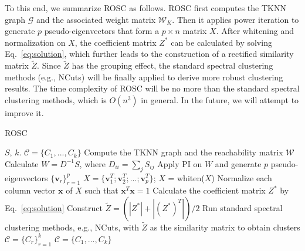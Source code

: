 {To this end, we summarize ROSC as follows.
ROSC first computes the TKNN graph $\mathcal{G}$
and the associated weight matrix $\mathcal{W}_K$. Then it applies power iteration to generate $p$
pseudo-eigenvectors that form a $p \times n$ matrix $X$.
After whitening and normalization on $X$,
the coefficient matrix $Z^*$ can be calculated by solving Eq.~\ref{eq:solution},
which further leads to the construction of a rectified similarity matrix $\tilde{Z}$.
Since $\tilde{Z}$ has the grouping effect, 
the standard spectral clustering methods (e.g., NCuts) will be finally applied to derive more robust clustering results.
The time complexity of ROSC will be no more than the standard spectral clustering methods,
which is $O(n^3)$ in general.
In the future, we will attempt to improve it. 
}

\begin{algorithm}
\begin{small}
\caption{ROSC}
\label{alg}
\begin{algorithmic}[1]
\Require $S$, $k$.
\Ensure $\mathcal{C} = \{C_1, ..., C_k\}$
\State Compute the TKNN graph and the reachability matrix $\mathcal{W}$
\State Calculate $W = D^{-1}S$, where $D_{ii} = \sum_jS_{ij}$
\State Apply PI on $W$ and generate $p$ pseudo-eigenvectors $\{\bm{v}_r\}_{r=1}^p$
\State $X = \{\bm{v}_1^T; \bm{v}_2^T; ...; \bm{v}_p^T\}$; $X$ = whiten($X$)
\State Normalize each column vector $\bm{x}$ of $X$ such that $\bm{x}^T\bm{x} = 1$
\State Calculate the coefficient matrix $Z^*$ by Eq.~\ref{eq:solution}
\State Construct $\tilde{Z} = (|Z^*| + |(Z^*)^T|)/2$
\State Run standard spectral clustering methods, e.g., NCuts, with $\tilde{Z}$ as the
similarity matrix to obtain clusters $\mathcal{C} = \{C_r\}_{r=1}^k$
\State \Return $\mathcal{C} = \{C_1, ..., C_k\}$
\end{algorithmic}
\end{small}
\end{algorithm}







